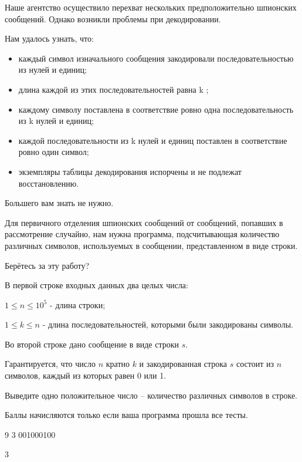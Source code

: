 
Наше агентство осуществило перехват нескольких предположительно шпионских сообщений. Однако возникли проблемы при декодировании.

Нам удалось узнать, что:

\begin{itemize}
    \item каждый символ изначального сообщения закодировали последовательностью из нулей и единиц;
    \item длина каждой из этих последовательностей равна k ;
    \item каждому символу поставлена в соответствие ровно одна последовательность из k нулей и единиц;
    \item каждой последовательности из k нулей и единиц поставлен в соответствие ровно один символ;
    \item экземпляры таблицы декодирования испорчены и не подлежат восстановлению.
\end{itemize}

Большего вам знать не нужно.

Для первичного отделения шпионских сообщений от сообщений, попавших в рассмотрение случайно, нам нужна программа, подсчитывающая количество различных символов, используемых в сообщении, представленном в виде строки.

Берётесь за эту работу?


В первой строке входных данных два целых числа:

$1 \le n \le 10^{5}$ - длина строки;

$1 \le k \le n$ - длина последовательностей, которыми были закодированы символы.

Во второй строке дано сообщение в виде строки $s$. 

Гарантируется, что число $n$ кратно $k$ и закодированная 
строка $s$ состоит из $n$ символов, каждый из которых равен 0 или 1.

\outputfmtSection

Выведите одно положительное число – количество различных символов в строке.

\markSection

Баллы начисляются только если ваша программа прошла все тесты.


\begin{myverbbox}[\small]{\vinput}
    9 3
    001000100
\end{myverbbox}
\begin{myverbbox}[\small]{\voutput}
    3
\end{myverbbox}

